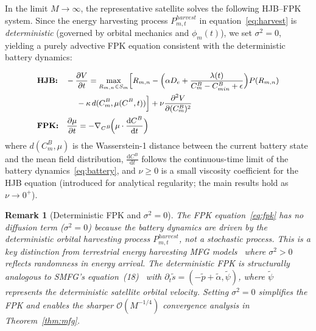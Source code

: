\documentclass[journal]{IEEEtran}
\newtheorem{remark}{Remark}
\newcommand{\CB}{C^{B}}
\newcommand{\CBmin}{C^{B}_{min}}
\begin{document}
In the limit $M\to\infty$, the representative satellite solves the following HJB--FPK system. Since the energy harvesting process $P_{m,t}^{harvest}$ in equation~\eqref{eq:harvest} is \emph{deterministic} (governed by orbital mechanics and $\phi_m(t)$), we set $\sigma^2=0$, yielding a purely advective FPK equation consistent with the deterministic battery dynamics:

\begin{subequations}
\label{eq:mfg_system}
\small
\begin{align}
    &\textbf{HJB:}\quad
    -\frac{\partial V}{\partial t}
    = \max_{R_{m,n}\in S_m}
    \Bigl[R_{m,n}
    - \Bigl(\alpha D_e
    + \frac{\lambda(t)}{\CB_m-\CBmin+\epsilon}
    \Bigr)P(R_{m,n})
    \notag\\
    &\qquad\qquad\quad
    - \kappa\,d(\CB_m,\mu(\CB,t))
    \Bigr]
    + \nu\frac{\partial^2 V}{\partial (\CB_m)^2}
    \label{eq:hjb}\\
    &\textbf{FPK:}\quad
    \frac{\partial\mu}{\partial t}
    = -\nabla_{\CB}\!\Bigl(\mu\cdot
    \frac{\mathrm{d}\CB}{\mathrm{d}t}\Bigr)
    \label{eq:fpk}
\end{align}
\end{subequations}
where $d(\CB_m,\mu)$ is the Wasserstein-1 distance between the current battery state and the mean field distribution, $\frac{\mathrm{d}\CB}{\mathrm{d}t}$ follows the continuous-time limit of the battery dynamics~\eqref{eq:battery}, and $\nu\geq 0$ is a small viscosity coefficient for the HJB equation (introduced for analytical regularity; the main results hold as $\nu\to 0^+$).

\begin{remark}[Deterministic FPK and $\sigma^2=0$]
\label{rem:fpk_deterministic}
The FPK equation~\eqref{eq:fpk} has no diffusion term ($\sigma^2=0$) because the battery dynamics are driven by the deterministic orbital harvesting process $P_{m,t}^{harvest}$, not a stochastic process. This is a key distinction from terrestrial energy harvesting MFG models~\cite{tembine2014risksensitive} where $\sigma^2>0$ reflects randomness in energy arrival. The deterministic FPK is structurally analogous to SMFG's equation~(18)~\cite{wang2023smfg} with $\partial_t\tilde{s} = (-\tilde{p}+\tilde{\alpha},\tilde{\psi})$, where $\tilde{\psi}$ represents the deterministic satellite orbital velocity. Setting $\sigma^2=0$ simplifies the FPK and enables the sharper $\mathcal{O}(M^{-1/4})$ convergence analysis in Theorem~\ref{thm:mfg}.
\end{remark}
\end{document}
